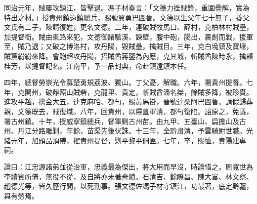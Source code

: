 \begin{pinyinscope}
同治元年，賊屢攻鎮江，皆擊退。馮子材奏言：「文德力挫賊鋒，重圍疊解，實為特出之材。」授貴州鎮遠鎮總兵，賜號翼勇巴圖魯。文德以生父年七十無子，養父文氏有二子，陳請復姓，更名文德。二年，連破賊牧馬口、薛村，克柏林村賊壘，加提督銜。賊由東路來犯，文德御諸駭溪、諫壁，腹中砲，腸出，裹創而戰，援軍至，賊乃退；又破之博洛村，攻丹陽，毀賊壘，擒賊目。三年，克白堍鎮及寶堰，賊黨紛紛來降。會鮑超攻丹陽，招賊酋蔣鑒為內應，克其城，斬賊酋陳時永，擒賴桂芳，以提督記名。江南平，予一品封典，命赴鎮遠鎮本任。

四年，總督勞崇光令募楚勇規荔波、獨山。丁父憂，解職。六年，署貴州提督。七年，克開州，破鼎照山賊砦，克龍里、貴定，斬賊酋潘名桀，餘賊多降，被珍賚。進攻平越，擒金大五，連克麻哈、都勻，賜黃馬褂，晉號達桑阿巴圖魯。請假歸葬親，文德既去，賊復熾。八年，回貴州，以糧匱軍潰，都勻復陷。詔原之，免議，署古州鎮。十年，授威寧鎮總兵，督軍剿古州苗。由九甲、五臺山、扁擔山及古州、丹江分路雕剿，年餘，苗渠先後伏誅。十三年，全黔肅清，予雲騎尉世職。光緒元年，加頭品頂帶，擢貴州提督，剿平黎平侗匪。七年，卒，賜恤，貴陽建專祠。

論曰：江忠源諸弟並從治軍，忠義最為傑出，將大用而早沒，時論惜之。周寬世為李續賓所倚，無役不從，及自將亦未著奇績。石清吉、餘際昌、陳大富、林文察、趙德光等，皆久歷行間，以死勤事。張文德佐馮子材守鎮江，功最著，底定黔疆，與有勞焉。


\end{pinyinscope}